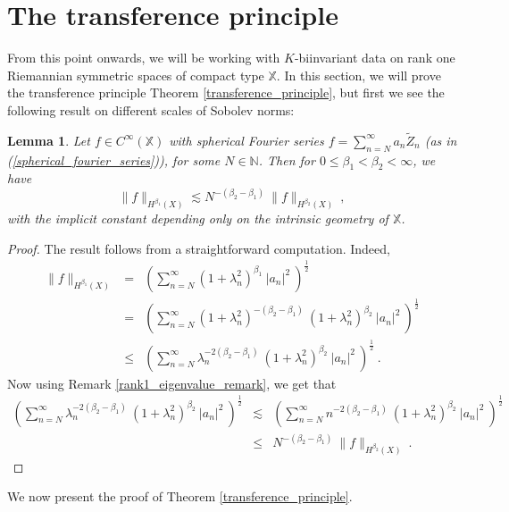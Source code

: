 \documentclass[12pt]{amsart}
\newtheorem{lemma}[theorem]{Lemma}
\theoremstyle{definition}
\newcommand{\N}{\mathbb N}%
\newcommand{\X}{\mathbb X}%
\numberwithin{equation}{section}
\begin{document}
\section{The transference principle}
From this point onwards, we will be working with $K$-biinvariant data on rank one Riemannian symmetric spaces of compact type $\X$. In this section, we will prove the transference principle Theorem \ref{transference_principle}, but first we see the following result on different scales of Sobolev norms:
\begin{lemma} \label{sobolev_comparison}
Let $f \in C^\infty(\X)$ with spherical Fourier series $f=\displaystyle\sum_{n=N}^\infty a_n \tilde{Z}_n$ (as in (\ref{spherical_fourier_series})), for some $N \in \N$. Then for $0 \le \beta_1 < \beta_2 < \infty$, we have
\begin{equation*}
\|f\|_{H^{\beta_1}(X)} \lesssim N^{-(\beta_2-\beta_1)}\:\|f\|_{H^{\beta_2}(X)}\:,
\end{equation*}
with the implicit constant depending only on the intrinsic geometry of $\X$.
\end{lemma}
\begin{proof}
The result follows from a straightforward computation. Indeed,
\begin{eqnarray*}
\|f\|_{H^{\beta_1}(X)} &=& \left(\sum_{n=N}^\infty {\left(1+\lambda^2_n\right)}^{\beta_1}\:{|a_n|}^2\:\right)^{\frac{1}{2}} \\
&=& \left(\sum_{n=N}^\infty {\left(1+\lambda^2_n\right)}^{-(\beta_2-\beta_1)}\:{\left(1+\lambda^2_n\right)}^{\beta_2}\:{|a_n|}^2\:\right)^{\frac{1}{2}} \\
&\le & \left(\sum_{n=N}^\infty \lambda^{-2(\beta_2-\beta_1)}_n\:{\left(1+\lambda^2_n\right)}^{\beta_2}\:{|a_n|}^2\:\right)^{\frac{1}{2}}\:.
\end{eqnarray*}
Now using Remark \ref{rank1_eigenvalue_remark}, we get that
\begin{eqnarray*}
\left(\sum_{n=N}^\infty \lambda^{-2(\beta_2-\beta_1)}_n\:{\left(1+\lambda^2_n\right)}^{\beta_2}\:{|a_n|}^2\:\right)^{\frac{1}{2}} &\lesssim & \left(\sum_{n=N}^\infty n^{-2(\beta_2-\beta_1)}\:{\left(1+\lambda^2_n\right)}^{\beta_2}\:{|a_n|}^2\:\right)^{\frac{1}{2}} \\
& \le & N^{-(\beta_2-\beta_1)}\:\|f\|_{H^{\beta_2}(X)}\:.
\end{eqnarray*}
\end{proof}
We now present the proof of Theorem \ref{transference_principle}.
\end{document}
